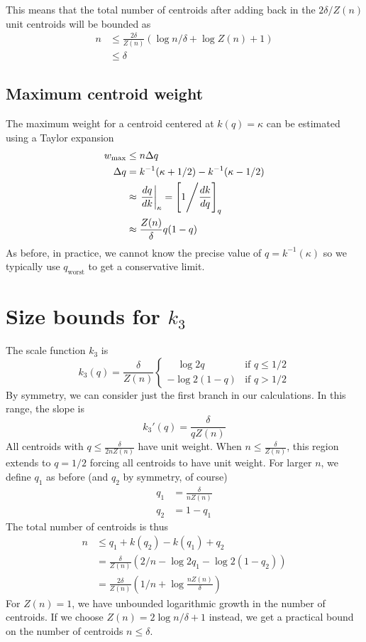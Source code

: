 \documentclass[11pt]{amsart}
\begin{document}
This means that the total number of centroids after adding back in the $2 \delta / Z(n)$ unit centroids will be bounded as
\[
\begin{aligned}
n&\le   \frac {2 \delta} {Z(n)} \left(  \log  n/ \delta + \log Z(n) + 1\right) \\
&\le  \delta
\end{aligned}
\]
\subsection{Maximum centroid weight}

The maximum weight for a centroid centered at $k(q) = \kappa$ can be estimated using a Taylor expansion
\[
\begin{aligned}
w_{\max} &\le n \Delta q \\
\Delta q &= k^{-1}(\kappa + 1/2) - k^{-1}(\kappa-1/2) \\
&\approx \left . \frac {dq} {dk} \right\rvert_{\kappa} = \left[ 1 \Bigg \slash {\frac {dk} {dq}} \right]_q\\
&\approx \frac {Z(n)} \delta q(1-q) \\
\end{aligned}
\]
As before, in practice, we cannot know the precise value of $q = k^{-1}(\kappa)$ so we typically use $q_{\text {worst}}$ to get a conservative limit.
\section{Size bounds for $k_3$}
The scale function $k_3$ is
\[
k_3(q) = \frac \delta {Z(n)}\begin{cases}
\quad \log 2q & \text{if  } q \le 1/2 \\
- \log 2(1-q) & \text{if  } q > 1/2
\end{cases}
\]
By symmetry, we can consider just the first branch in our calculations. In this range, the slope is
\[
k_3'(q) = \frac \delta { q Z(n)}  
\]
All centroids with $q \le \frac \delta {2 n Z(n)}$ have unit weight. When $n \le \frac \delta {Z(n)}$, this region extends to $q = 1/2$ forcing all centroids to have unit weight. For larger $n$, we define $q_1$ as before (and $q_2$ by symmetry, of course)
\[
\begin{aligned}
q_1 &= \frac \delta { n Z(n)} \\
q_2 &= 1-q_1
\end{aligned}
\]
The total number of centroids is thus
\[
\begin{aligned}
n &\le q_1 + k(q_2) - k(q_1) + q_2 \\
&= \frac \delta { Z(n)} \left(2/n -\log 2 q_1 - \log 2(1-q_2)\right)\\
&= \frac {2\delta} { Z(n)} \left(1/n + \log  \frac  { n Z(n)}\delta\right)
\end{aligned}
\]
For $Z(n)=1$, we have unbounded logarithmic growth in the number of centroids. If we choose $Z(n) = 2\log n/\delta + 1$ instead, we get a practical bound on the number of centroids $n \le \delta$.
\end{document}
